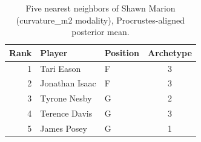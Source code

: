 \begin{table}[htbp]
  \centering\small
  \begin{tabular}{rllc}
    \toprule
    Rank & Player & Position & Archetype \\
    \midrule
    1 & Tari Eason & F & 3 \\
    2 & Jonathan Isaac & F & 3 \\
    3 & Tyrone Nesby & G & 2 \\
    4 & Terence Davis & G & 3 \\
    5 & James Posey & G & 1 \\
    \bottomrule
  \end{tabular}
  \caption{Five nearest neighbors of Shawn Marion (curvature_m2 modality), Procrustes-aligned posterior mean.}
  \label{tab:Shawn_Marion_neighbors_curvature_m2}
\end{table}

